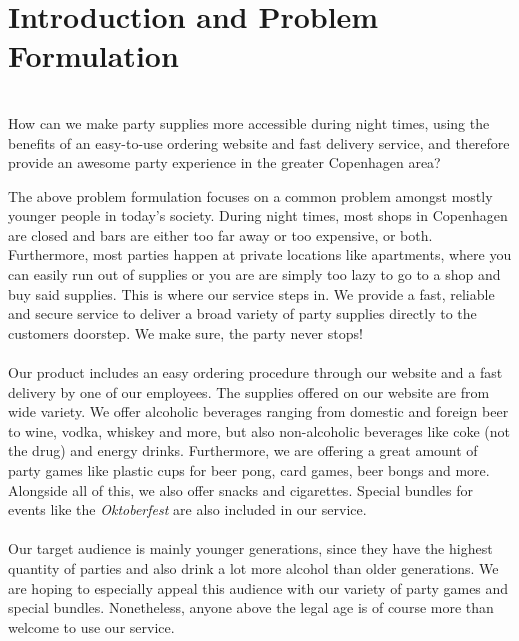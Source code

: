 \documentclass[12p]{article}
\begin{document}

\section{Introduction and Problem Formulation}

\begin{center}
\vspace{1em}
\SlimHRule\\[0.1cm]
\Large{How can we make party supplies more accessible during night times, using the benefits of an easy-to-use ordering website and fast delivery service, and therefore provide an awesome party experience in the greater Copenhagen area?}
\SlimHRule\\[0.1cm]
\vspace{1em}
\end{center}

The above problem formulation focuses on a common problem amongst mostly younger people in today's society. During night times, most shops in Copenhagen are closed and bars are either too far away or too expensive, or both. Furthermore, most parties happen at private locations like apartments, where you can easily run out of supplies or you are are simply too lazy to go to a shop and buy said supplies. This is where our service steps in. We provide a fast, reliable and secure service to deliver a broad variety of party supplies directly to the customers doorstep. We make sure, the party never stops! 
\\ \\
Our product includes an easy ordering procedure through our website and a fast delivery by one of our employees. The supplies offered on our website are from wide variety. We offer alcoholic beverages ranging from domestic and foreign beer to wine, vodka, whiskey and more, but also non-alcoholic beverages like coke (not the drug) and energy drinks. Furthermore, we are offering a great amount of party games like plastic cups for beer pong, card games, beer bongs and more. Alongside all of this, we also offer snacks and cigarettes. Special bundles for events like the \emph{Oktoberfest} are also included in our service.
\\ \\
Our target audience is mainly younger generations, since they have the highest quantity of parties and also drink a lot more alcohol than older generations. We are hoping to especially appeal this audience with our variety of party games and special bundles. Nonetheless, anyone above the legal age is of course more than welcome to use our service.
\end{document}
